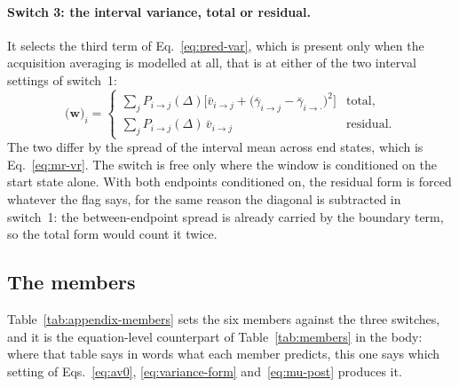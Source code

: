 \begin{appendixbox}
\paragraph{Switch 3: the interval variance, total or residual.} It selects the third term of
Eq.~\ref{eq:pred-var}, which is present only when the acquisition averaging is modelled at
all, that is at either of the two interval settings of switch~1:
\begin{equation}
  \bigl(\mathbf{w}\bigr)_{i} =
  \begin{cases}
    \sum_{j} P_{i\to j}(\Delta)\bigl[\bar{v}_{i\to j}
      + \bigl(\bar{\gamma}_{i\to j}-\bar{\gamma}_{i\to\cdot}\bigr)^2\bigr]
      & \text{total,}\\[4pt]
    \sum_{j} P_{i\to j}(\Delta)\,\bar{v}_{i\to j}
      & \text{residual.}
  \end{cases}
  \label{eq:variance-form}
\end{equation}
The two differ by the spread of the interval mean across end states, which is
Eq.~\ref{eq:mr-vr}. The switch is free only where the window is conditioned on the start
state alone. With both endpoints conditioned on, the
residual form is forced whatever the flag says, for the same reason the diagonal is
subtracted in switch~1: the between-endpoint spread is already carried by the boundary term,
so the total form would count it twice. %

\subsection*{The members}

Table~\ref{tab:appendix-members} sets the six members against the three switches, and it is
the equation-level counterpart of Table~\ref{tab:members} in the body: where that table says in
words what each member predicts, this one says which setting of Eqs.~\ref{eq:av0},
\ref{eq:variance-form} and~\ref{eq:mu-post} produces it.


\end{appendixbox}
